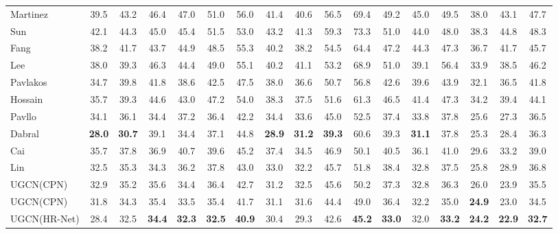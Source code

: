 \documentclass[runningheads]{llncs}
\begin{document}
\begin{table}[t]
\begin{tabular}[width=0.9\linewidth]{@{}l| ccccccccccccccc |c   @{}}
    \midrule
    Martinez~\cite{martinez2017simple} & 39.5& 43.2& 46.4& 47.0& 51.0& 56.0& 41.4& 40.6& 56.5& 69.4& 49.2& 45.0& 49.5& 38.0& 43.1& 47.7 \\
    Sun~\cite{sun2017compositional} & 42.1& 44.3& 45.0& 45.4& 51.5& 53.0& 43.2& 41.3& 59.3& 73.3& 51.0& 44.0& 48.0& 38.3& 44.8& 48.3 \\
    Fang~\cite{fang2018learning} & 38.2& 41.7& 43.7& 44.9& 48.5& 55.3& 40.2& 38.2& 54.5& 64.4& 47.2& 44.3& 47.3& 36.7& 41.7& 45.7 \\
    Lee~\cite{lee2018propagating} & 38.0& 39.3& 46.3& 44.4& 49.0& 55.1& 40.2& 41.1& 53.2& 68.9& 51.0& 39.1& 56.4& 33.9& 38.5& 46.2 \\
    Pavlakos~\cite{pavlakos2018ordinal} & 34.7& 39.8& 41.8& 38.6& 42.5& 47.5& 38.0& 36.6& 50.7& 56.8& 42.6& 39.6& 43.9& 32.1& 36.5& 41.8 \\
    \midrule
    Hossain~\cite{rayat2018exploiting} & 35.7& 39.3& 44.6& 43.0& 47.2& 54.0& 38.3& 37.5& 51.6& 61.3& 46.5& 41.4& 47.3& 34.2& 39.4& 44.1 \\
    Pavllo~\cite{pavllo20193d} & 34.1& 36.1& 34.4& 37.2& 36.4& 42.2& 34.4& 33.6& 45.0& 52.5& 37.4& 33.8& 37.8& 25.6& 27.3& 36.5 \\
    Dabral~\cite{dabral2018learning} & \textbf{28.0}& \textbf{30.7}& 39.1& 34.4& 37.1& 44.8& \textbf{28.9}& \textbf{31.2}& \textbf{39.3}& 60.6& 39.3& \textbf{31.1}& 37.8& 25.3& 28.4& 36.3 \\
    Cai~\cite{cai2019exploiting} & 35.7& 37.8& 36.9& 40.7& 39.6& 45.2& 37.4& 34.5& 46.9& 50.1& 40.5& 36.1& 41.0& 29.6& 33.2& 39.0 \\
    Lin~\cite{lin2019trajectory} & 32.5& 35.3& 34.3& 36.2& 37.8& 43.0& 33.0& 32.2& 45.7& 51.8& 38.4& 32.8& 37.5& 25.8& 28.9& 36.8 \\
    \midrule
    UGCN(CPN)& 32.9 & 35.2 & 35.6 & 34.4 & 36.4 & 42.7 & 31.2 & 32.5 & 45.6 & 50.2 & 37.3 & 32.8 & 36.3 & 26.0 & 23.9 & 35.5 \\
    UGCN(CPN) & 31.8 & 34.3 & 35.4 & 33.5 & 35.4 & 41.7 & 31.1 & 31.6 & 44.4 & 49.0 & 36.4 & 32.2 & 35.0 & \textbf{24.9} & 23.0 & 34.5 \\
   UGCN(HR-Net)& 28.4& 32.5 & \textbf{34.4} & \textbf{32.3} & \textbf{32.5} & \textbf{40.9} & 30.4 & 29.3 & 42.6 & \textbf{45.2} & \textbf{33.0} & 32.0& \textbf{33.2} & \textbf{24.2} & \textbf{22.9} & \textbf{32.7} \\
    \bottomrule
    \end{tabular}
\end{table}
\end{document}
